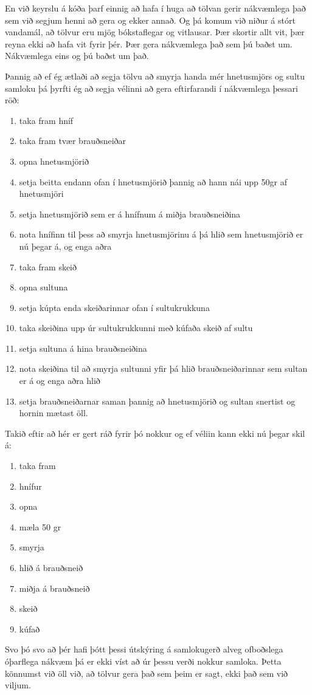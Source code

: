 \documentclass[11pt,fleqn]{book} %
\begin{document}
En við keyrslu á kóða þarf einnig að hafa í huga að tölvan gerir nákvæmlega það sem við segjum henni að gera og ekker annað.
Og þá komum við niður á stórt vandamál, að tölvur eru mjög bókstaflegar og vitlausar.
Þær skortir allt vit, þær reyna ekki að hafa vit fyrir þér. 
Þær gera nákvæmlega það sem þú baðst um.
Nákvæmlega eins og þú baðst um það.

Þannig að ef ég ætlaði að segja tölvu að smyrja handa mér hnetusmjörs og sultu samloku þá þyrfti ég að segja vélinni að gera eftirfarandi í nákvæmlega þessari röð:
\vspace{0.4cm}
\begin{enumerate}
	\item taka fram hníf
	\item taka fram tvær brauðsneiðar
	\item opna hnetusmjörið
	\item setja beitta endann ofan í hnetusmjörið þannig að hann nái upp 50gr af hnetusmjöri
	\item setja hnetusmjörið sem er á hnífnum á miðja brauðsneiðina
	\item nota hnífinn til þess að smyrja hnetusmjörinu á þá hlið sem hnetusmjörið er nú þegar á, og enga aðra
	\item taka fram skeið
	\item opna sultuna
	\item setja kúpta enda skeiðarinnar ofan í sultukrukkuna 
	\item taka skeiðina upp úr sultukrukkunni með kúfaða skeið af sultu
	\item setja sultuna á hina brauðsneiðina
	\item nota skeiðina til að smyrja sultunni yfir þá hlið brauðsneiðarinnar sem sultan er á og enga aðra hlið
	\item  setja brauðsneiðarnar saman þannig að hnetusmjörið og sultan snertist og hornin mætast öll. 
\end{enumerate} 
\vspace{0.4cm}
Takið eftir að hér er gert ráð fyrir þó nokkur og ef véliin kann ekki nú þegar skil á: 
\vspace{0.2cm}
\begin{enumerate}
	\item taka fram
	\item hnífur
	\item opna
	\item mæla 50 gr
	\item smyrja
	\item hlið á brauðsneið
	\item miðja á brauðsneið
	\item skeið
	\item kúfað
\end{enumerate} 
\vspace{0.2cm}
Svo þó svo að þér hafi þótt þessi útskýring á samlokugerð alveg ofboðslega óþarflega nákvæm þá er ekki víst að úr þessu verði nokkur samloka.
Þetta könnumst við öll við, að tölvur gera það sem þeim er sagt, ekki það sem við viljum.
\end{document}
